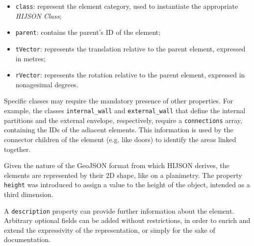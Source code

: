 \begin{itemize}
\itemsep1pt\parskip0pt
\item
 {\tt class}: represent the element category, used to instantiate
 the appropriate \emph{HIJSON Class};
\item
 {\tt parent}: contains the parent's ID of the element;
\item
 {\tt tVector}: represents the translation relative to 
 the parent element, expressed in metres;
\item
 {\tt rVector}: represents the rotation relative to 
 the parent element, expressed in nonagesimal degrees.
\end{itemize}

Specific classes may require the mandatory presence of other properties. For
example, the classes {\tt internal\_wall} and {\tt external\_wall} that
define the internal partitions and the external envelope, respectively, require a {\tt connections}
array, containing the IDs of the adiacent elements. This information is used
by the connector children of the element (e.g. like doors) to identify the
areas linked together.

Given the nature of the GeoJSON format from which HIJSON
derives, the elements are represented by their 2D shape, like on a
planimetry. The property {\tt height} was introduced to assign a value to the height of the object, intended as
a third dimension.

A {\tt description} property can provide further information about
the element.
Arbitrary optional fields can be added without restrictions, in order to
enrich and extend the expressivity of the representation, or simply for the sake of 
documentation.
